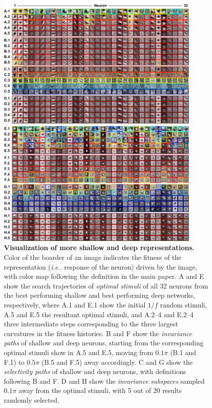 \documentclass{article} %
\makeatletter
\DeclareRobustCommand\onedot{\futurelet\@let@token\@onedot}
\def\@onedot{\ifx\@let@token.\else.\null\fi\xspace}
\def\ie{\emph{i.e}\onedot} \def\Ie{\emph{I.e}\onedot}
\makeatother
\begin{document}
\begin{figure}[H]
\centering \includegraphics[width=0.90\textwidth]{Figs_supp/pic1.pdf} 
\caption{{\bf Visualization of more shallow and deep representations.}
Color of the boarder of an image indicates the fitness of the representation (\ie response of the neuron) driven by the image, with color map following the definition in the main paper.
A and E show the search trajectories of \emph{optimal stimuli} of all 32 neurons from the best performing shallow and best performing deep networks, respectively, where A.1 and E.1 show the initial $1/f$ random stimuli, A.5 and E.5 the resultant optimal stimuli, and A.2--4 and E.2--4 three intermediate steps corresponding to the three largest curvatures in the fitness histories.
B and F show the \emph{invariance paths} of shallow and deep neurons, starting from the corresponding optimal stimuli show in A.5 and E.5, moving from $0.1\pi$ (B.1 and F.1) to $0.5\pi$ (B.5 and F.5) away accordingly.
C and G show the \emph{selectivity paths} of shallow and deep neurons, with definitions following B and F.
D and H show the \emph{invariance subspaces} sampled $0.1\pi$ away from the optimal stimuli, with 5 out of 20 results randomly selected.
} %
\end{figure}
\end{document}
